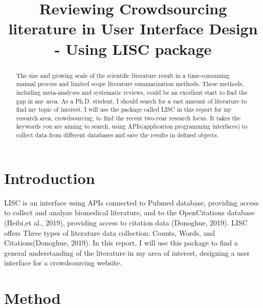 \documentclass{article}
\title {Reviewing Crowdsourcing literature in User Interface Design - Using LISC package }
\begin{document}
\maketitle

\begin{abstract} %
The size and growing scale of the scientific literature result in a time-consuming manual process and limited scope literature summarization methods. These methods, including meta-analyses and systematic reviews, could be an excellent start to find the gap in any area. As a Ph.D. student, I should search for a vast amount of literature to find my topic of interest. I will use the package called LISC in this report for my research area, crowdsourcing, to find the recent two-year research focus. It takes the keywords you are aiming to search, using APIs(application programming interfaces) to collect data from different databases and save the results in defined objects.
\end{abstract}


\section{Introduction}
LISC is an interface using APIs  connected to Pubmed database, providing access to collect and analyze biomedical literature, and to the OpenCitations database (Heibi,et al., 2019), providing access to citation data (Donoghue, 2019). LISC offers Three types of literature data collection: Counts, Words, and Citations(Donoghue, 2019). In this report, I will use this package to find a general understanding of the literature in my area of interest, designing a user interface for a crowdsourcing website.

\section{Method}
\end{document}
